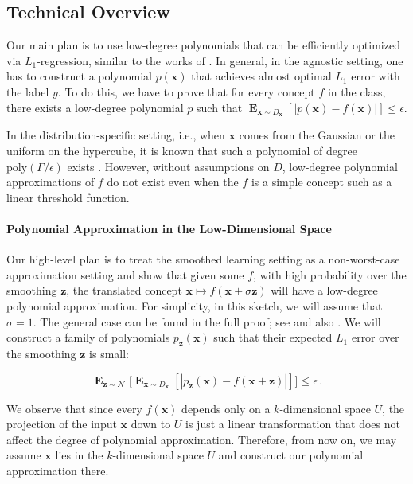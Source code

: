 \documentclass{theoretics}
\DeclareMathOperator*{\E}{\mathbf{E}}
\newcommand{\1}{\Ind}
\begin{document}
\subsection{Technical Overview}
\label{sec:techniques}



Our main plan is to use low-degree polynomials that can be efficiently optimized via $L_1$-regression, similar to the works of \cite{KKMS:05, KOS:08}. In general, in the agnostic setting, one has to construct a polynomial $p(\mathbf{x})$ that achieves almost optimal $L_1$ error with the label $y$. To do this, we have to prove that for every concept $f$ in the class, there exists a low-degree polynomial $p$ such that ${\E}_{\mathbf{x} \sim D_{\mathbf{x}}} [|p(\mathbf{x}) - f(\mathbf{x})|] \leq \epsilon$.

In the distribution-specific setting, i.e., when $\mathbf{x}$ comes from the Gaussian or the uniform on the hypercube, it is known that such a polynomial of degree $\text{poly}(\Gamma/\epsilon)$ exists \cite{KOS:08}. However, without assumptions on $D$, low-degree polynomial approximations of $f$ do not exist even when the $f$ is a simple concept such as a linear threshold function.

\paragraph{Polynomial Approximation in the Low-Dimensional Space}

Our high-level plan is to treat the smoothed learning setting as a non-worst-case approximation setting and show that given some $f$, with high probability over the smoothing $\mathbf{z}$, the translated concept $\mathbf{x} \mapsto f(\mathbf{x} + \sigma \mathbf{z})$ will have a low-degree polynomial approximation. For simplicity, in this sketch, we will assume that $\sigma = 1$. The general case can be found in the full proof; see  and also . We will construct a family of polynomials $p_{\mathbf{z}}(\mathbf{x})$ such that their expected $L_1$ error over the smoothing $\mathbf{z}$ is small:

\[
\E_{\mathbf{z} \sim \mathcal{N}}\Big[ \E_{\mathbf{x} \sim D_{\mathbf{x}}} [|p_{\mathbf{z}}(\mathbf{x}) - f(\mathbf{x} + \mathbf{z})|] \Big] \leq \epsilon\,.
\]

We observe that since every $f(\mathbf{x})$ depends only on a $k$-dimensional space $U$, the projection of the input $\mathbf{x}$ down to $U$ is just a linear transformation that does not affect the degree of polynomial approximation. Therefore, from now on, we may assume $\mathbf{x}$ lies in the $k$-dimensional space $U$ and construct our polynomial approximation there.
\end{document}

